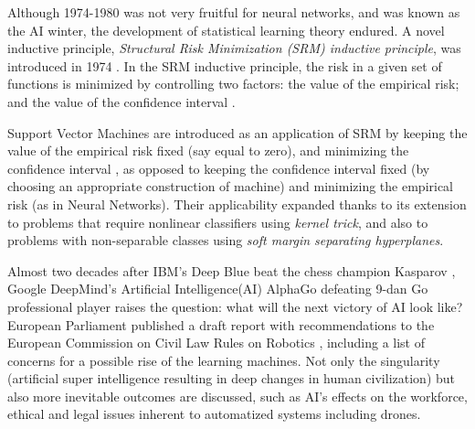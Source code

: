 Although 1974-1980 was not very fruitful for neural networks, and was known as the AI winter, the development of statistical learning theory endured.  A novel inductive principle, \emph{Structural Risk Minimization (SRM) inductive principle}, was introduced in 1974 \cite{vapnik1974theory}. 
In the SRM inductive principle, the risk in a given set of functions is minimized by controlling two factors: the value of the empirical risk; and the value of the confidence interval \cite{vapnik2013nature}. 

Support Vector Machines \cite{vapnik1974theory,vapnik2006estimation} are introduced as an application of SRM by keeping the value of the empirical risk fixed (say equal to zero), and minimizing the confidence interval \cite{vapnik2013nature}, as opposed to keeping the confidence interval fixed (by choosing an appropriate construction of machine) and minimizing the empirical risk (as in Neural Networks). 
Their applicability expanded thanks to its extension to problems that require nonlinear classifiers \cite{boser1992training} using \emph{kernel trick}, \cite{aizerman1964theoretical} and also to problems with non-separable classes \cite{cortes1995support} using \emph{soft margin separating hyperplanes}. 


Almost two decades after IBM's Deep Blue beat the chess champion Kasparov \cite{deepBlue}, Google DeepMind's Artificial Intelligence(AI) AlphaGo \cite{alphaGoDeepMind,alphaGo} defeating 9-dan Go professional player raises the question: what will the next victory of AI look like?
European Parliament published a draft report with recommendations to the European Commission on Civil Law Rules on Robotics \cite{delvaux2017report}, including a list of concerns for a possible rise of the learning machines. 
Not only the singularity (artificial super intelligence resulting in deep changes in human civilization) but also more inevitable outcomes are discussed, such as AI's effects on the workforce, ethical and legal issues inherent to automatized systems including drones.

